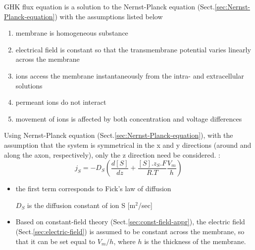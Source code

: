 GHK flux equation is a solution to the Nernst-Planck equation
(Sect.\ref{sec:Nernst-Planck-equation}) with the assumptions listed below
\begin{enumerate}
  \item membrane is homogeneous substance
  \item electrical field is constant so that the transmembrane potential varies
  linearly across the membrane
  \item  ions access the membrane instantaneously from the intra- and
  extracellular solutions
  \item permeant ions do not interact
  \item movement of ions is affected by both concentration and voltage
  differences
\end{enumerate}


Using Nernst-Planck equation (Sect.\ref{sec:Nernst-Planck-equation}), with the
assumption that the system is symmetrical in the x and y directions (around and
along the axon, respectively), only the z direction need be considered. :
\begin{equation}
j_S =   -D_S (\frac{d[S]}{dz} + \frac{[S].z_S.F}{R.T}\frac{V_m}{h})
\end{equation}


\begin{itemize}
  \item the first term corresponds to Fick's law of diffusion

  $D_S$ is the diffusion constant of ion S [m$^2$/sec]

  \item Based on constant-field theory (Sect.\ref{sec:const-field-appr}),
  the electric field (Sect.\ref{sec:electric-field}) is assumed to be constant
  across the membrane, so that it can be set equal to $V_m/h$, where $h$ is the
  thickness of the membrane.

\end{itemize}


